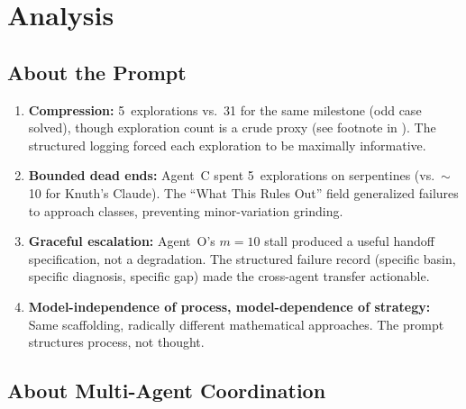 \documentclass[11pt]{article}
\theoremstyle{definition}
\theoremstyle{remark}
\begin{document}
\section{Analysis}
\label{sec:analysis}

\subsection{About the Prompt}

\begin{enumerate}[label=(\alph*)]
    \item \textbf{Compression:} 5~explorations vs.\ 31 for the same milestone (odd case solved), though exploration count is a crude proxy (see footnote in ). The structured logging forced each exploration to be maximally informative.
    \item \textbf{Bounded dead ends:} Agent~C spent 5~explorations on serpentines (vs.\ $\sim$10 for Knuth's Claude). The ``What This Rules Out'' field generalized failures to approach classes, preventing minor-variation grinding.
    \item \textbf{Graceful escalation:} Agent~O's $m = 10$ stall produced a useful handoff specification, not a degradation. The structured failure record (specific basin, specific diagnosis, specific gap) made the cross-agent transfer actionable.
    \item \textbf{Model-independence of process, model-dependence of strategy:} Same scaffolding, radically different mathematical approaches. The prompt structures process, not thought.
\end{enumerate}

\subsection{About Multi-Agent Coordination}
\end{document}
